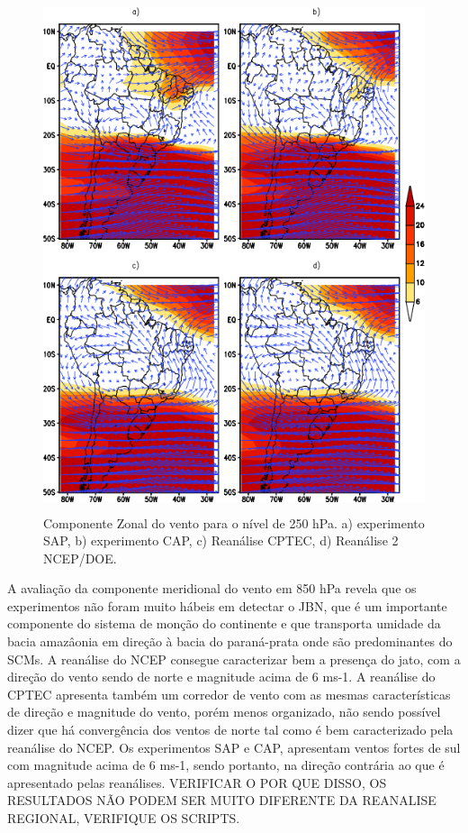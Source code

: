 \begin{figure}[!hbp]
\centering
\includegraphics[height=15cm]{./figs/media_vento-zonal_anl_250hPa.png}
\caption{Componente Zonal do vento para o nível de 250 hPa. a) experimento SAP, b) experimento CAP, c) Reanálise CPTEC, d) Reanálise 2 NCEP/DOE.}
\label{fig37}
\end{figure}

A avaliação da componente meridional do vento em 850 hPa revela que os experimentos não foram muito hábeis em detectar o JBN, que é um importante componente do sistema de monção do continente e que transporta umidade da bacia amazâonia em direção à bacia do paraná-prata onde são predominantes do SCMs. A reanálise do NCEP consegue caracterizar bem a presença do jato, com a direção do vento sendo de norte e magnitude acima de 6 ms-1. A reanálise do CPTEC apresenta também um corredor de vento com as mesmas características de direção e magnitude do vento, porém menos organizado, não sendo possível dizer que há convergência dos ventos de norte tal como é bem caracterizado pela reanálise do NCEP. Os experimentos SAP e CAP, apresentam ventos fortes de sul com magnitude acima de 6 ms-1, sendo portanto, na direção contrária ao que é apresentado pelas reanálises. VERIFICAR O POR QUE DISSO, OS RESULTADOS NÃO PODEM SER MUITO DIFERENTE DA REANALISE REGIONAL, VERIFIQUE OS SCRIPTS. 

